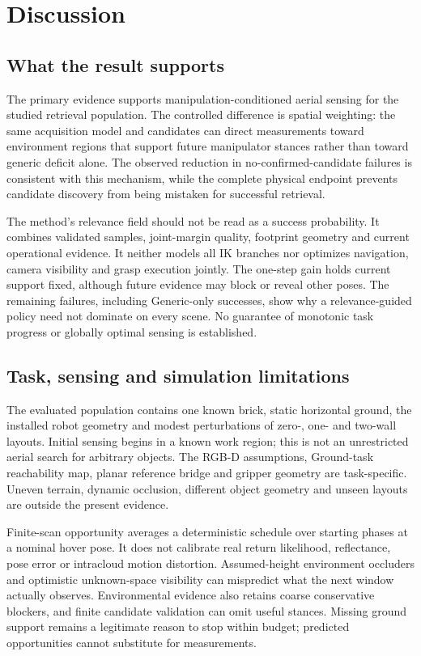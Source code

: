 \section{Discussion}
\label{sec:discussion}
\subsection{What the result supports}
The primary evidence supports manipulation-conditioned aerial sensing for the
studied retrieval population. The controlled difference is spatial weighting:
the same acquisition model and candidates can direct measurements toward
environment regions that support future manipulator stances rather than toward
generic deficit alone. The observed reduction in no-confirmed-candidate failures
is consistent with this mechanism, while the complete physical endpoint prevents
candidate discovery from being mistaken for successful retrieval.

The method's relevance field should not be read as a success probability. It
combines validated samples, joint-margin quality, footprint geometry and current
operational evidence. It neither models all IK branches nor optimizes navigation,
camera visibility and grasp execution jointly. The one-step gain holds current
support fixed, although future evidence may block or reveal other poses. The
remaining failures, including Generic-only successes, show why a relevance-guided
policy need not dominate on every scene. No guarantee of monotonic task progress
or globally optimal sensing is established.

\subsection{Task, sensing and simulation limitations}
\label{sec:limitations}
The evaluated population contains one known brick, static horizontal ground,
the installed robot geometry and modest perturbations of zero-, one- and
two-wall layouts. Initial sensing begins in a known work region; this is not
an unrestricted aerial search for arbitrary objects. The RGB-D assumptions,
Ground-task reachability map, planar reference bridge and gripper geometry are
task-specific. Uneven terrain, dynamic occlusion, different object geometry and
unseen layouts are outside the present evidence.

Finite-scan opportunity averages a deterministic schedule over starting phases
at a nominal hover pose. It does not calibrate real return likelihood,
reflectance, pose error or intracloud motion distortion. Assumed-height
environment occluders and optimistic unknown-space visibility can mispredict
what the next window actually observes. Environmental evidence also retains
coarse conservative blockers, and finite candidate validation can omit useful
stances. Missing ground support remains a legitimate reason to stop within
budget; predicted opportunities cannot substitute for measurements.

